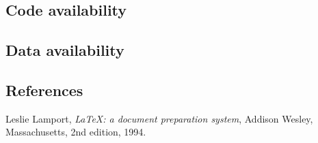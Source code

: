 \documentclass[twocolumn, linenumbers, superscriptaddress]{revtex4-1}
\begin{document}
		\subsection*{Code availability}
			\blindtext[3]
			
		\subsection*{Data availability}
			\blindtext[3]

	\begin{thebibliography}{50}
		\section*{References}	
			Leslie Lamport,
			\textit{\LaTeX: a document preparation system},
			Addison Wesley, Massachusetts,
			2nd edition,
			1994.

	\end{thebibliography}
\end{document}
